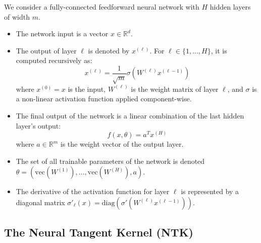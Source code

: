 \documentclass[a4paper]{article}
\begin{document}
We consider a fully-connected feedforward neural network with $H$ hidden layers of width $m$.
\begin{itemize}
    \item The network input is a vector $x \in \mathbb{R}^d$.
    \item The output of layer $\ell$ is denoted by $x^{(\ell)}$. For $\ell \in \{1, \dots, H\}$, it is computed recursively as:
    \begin{equation}
        x^{(\ell)} = \frac{1}{\sqrt{m}}\sigma(W^{(\ell)}x^{(\ell-1)})
    \end{equation}
    where $x^{(0)} = x$ is the input, $W^{(\ell)}$ is the weight matrix of layer $\ell$, and $\sigma$ is a non-linear activation function applied component-wise.
    \item The final output of the network is a linear combination of the last hidden layer's output:
    \begin{equation}
        f(x, \theta) = a^T x^{(H)}
    \end{equation}
    where $a \in \mathbb{R}^m$ is the weight vector of the output layer.
    \item The set of all trainable parameters of the network is denoted $\theta = (\text{vec}(W^{(1)}), \dots, \text{vec}(W^{(H)}), a)$.
    \item The derivative of the activation function for layer $\ell$ is represented by a diagonal matrix $\sigma'_\ell(x) = \text{diag}(\sigma'(W^{(\ell)}x^{(\ell-1)}))$.
\end{itemize}

\subsection{The Neural Tangent Kernel (NTK)}
\end{document}
